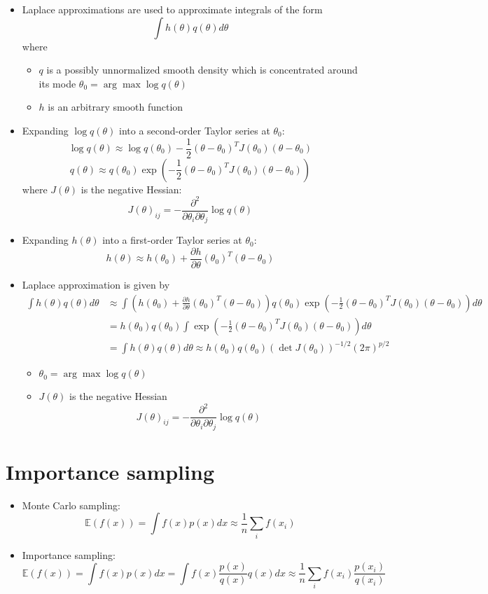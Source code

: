 \documentclass[a4paper]{article}
\begin{document}
\begin{itemize}
    \item Laplace approximations are used to approximate integrals of the form
    \[\int h(\theta)q(\theta)d\theta \]
    where
    \begin{itemize}
        \item $q$ is a possibly unnormalized smooth density which is concentrated around its mode $\theta_0=\arg\max\log q(\theta)$
        \item $h$ is an arbitrary smooth function
    \end{itemize}
    \item Expanding $\log q(\theta)$ into a second-order Taylor series at $\theta_0$:
    \[\log q(\theta)\approx\log q(\theta_0)-\frac{1}{2}(\theta-\theta_0)^TJ(\theta_0)(\theta-\theta_0) \]
    \[q(\theta)\approx q(\theta_0)\exp\left(-\frac{1}{2}(\theta-\theta_0)^TJ(\theta_0)(\theta-\theta_0) \right) \]
    where $J(\theta)$ is the negative Hessian:
    \[J(\theta)_{ij}=-\frac{\partial^2}{\partial\theta_i\partial\theta_j}\log q(\theta) \]
    \item Expanding $h(\theta)$ into a first-order Taylor series at $\theta_0$:
    \[h(\theta)\approx h(\theta_0)+\frac{\partial h}{\partial\theta}(\theta_0)^T(\theta-\theta_0) \]
    \item Laplace approximation is given by
    \begin{align*}
        \int h(\theta)q(\theta)d\theta&\approx
        \int \left(h(\theta_0)+\frac{\partial h}{\partial\theta}(\theta_0)^T(\theta-\theta_0)\right)
        q(\theta_0)\exp\left(-\frac{1}{2}(\theta-\theta_0)^TJ(\theta_0)(\theta-\theta_0) \right)d\theta \\
        &=h(\theta_0)q(\theta_0)\int\exp\left(-\frac{1}{2}(\theta-\theta_0)^TJ(\theta_0)(\theta-\theta_0) \right)d\theta \\
        &=\int h(\theta)q(\theta)d\theta\approx h(\theta_0)q(\theta_0)(\det J(\theta_0))^{-1/2}(2\pi)^{p/2}
    \end{align*}
    \begin{itemize}
        \item $\theta_0=\arg\max \log q(\theta)$
        \item $J(\theta)$ is the negative Hessian
        \[J(\theta)_{ij}=-\frac{\partial^2}{\partial\theta_i\partial\theta_j}\log q(\theta) \]
    \end{itemize}
\end{itemize}

\section*{Importance sampling}

\begin{itemize}
    \item Monte Carlo sampling:
    \[\mathbb{E}(f(x))=\int f(x)p(x)dx\approx\frac{1}{n}\sum_i f(x_i) \]
    \item Importance sampling:
    \[\mathbb{E}(f(x))=\int f(x)p(x)dx=\int f(x)\frac{p(x)}{q(x)}q(x)dx\approx\frac{1}{n}\sum_if(x_i)\frac{p(x_i)}{q(x_i)} \]
\end{itemize}
\end{document}
